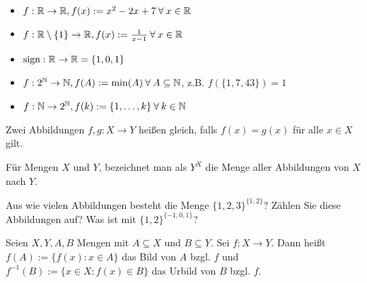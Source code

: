 
%

\begin{bsp}
\begin{itemize}
	\item $ f : \mathbb{R} \to \mathbb{R},\\ f(x) := x^2 -2x + 7 \:\forall\: x \in \mathbb{R} $
	\item $ f : \mathbb{R} \setminus \{ 1 \} \to \mathbb{R},\\ f(x) := \frac{1}{x-1} \:\forall\: x \in \mathbb{R} $
	\item $ \operatorname{sign}: \mathbb{R} \to \mathbb{R} = \{ 1,0,1 \} $
	\item $ f : 2^{\mathbb{N}} \to \mathbb{N}, f(A) := \min(A) \:\forall\: A \subseteq \mathbb{N} $, z.B. $ f( \{ 1,7,43 \} ) = 1 $
	\item $ f : \mathbb{N} \to 2^{\mathbb{N}}, f(k) := \{ 1,\ldots,k \} \:\forall\: k \in \mathbb{N} $
\end{itemize}
\end{bsp} 

\begin{bem}
Zwei Abbildungen $ f,g : X \to Y $ heißen gleich, falls $ f(x) = g(x) $ für alle $ x \in X $ gilt. 
\end{bem} 

\begin{bem} 
	Für Mengen $X$ und $Y$, 
	bezeichnet man als $ Y^X $  die Menge aller Abbildungen von $ X $ nach $ Y $.
\end{bem} 

\begin{aufg}
	Aus wie vielen Abbildungen besteht die Menge $\{1,2,3\}^{\{1,2\}}$? Zählen Sie diese Abbildungen auf? Was ist  mit $\{1,2\}^{\{-1,0,1\}}$?
\end{aufg} 

\begin{defn}
Seien $ X,Y,A,B $ Mengen mit $ A \subseteq X $ und $ B \subseteq Y $. Sei $ f : X \to Y $. Dann heißt $ f(A) := \{ f(x) : x \in A \} $ das Bild von $ A $ bzgl. $ f $ und $ f^{-1}(B) := \{ x \in X : f(x) \in B \} $ das Urbild von $ B $ bzgl. $ f $.
\end{defn} 

